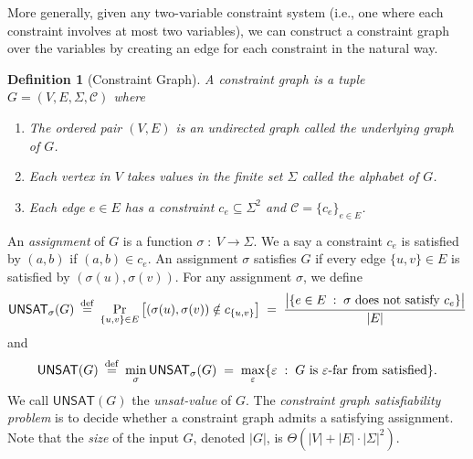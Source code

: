 \documentclass{article}
\newtheorem{definition}[theorem]{Definition}
\newcommand{\class}[1]{\mathbf{#1}}
\newcommand{\NP}{\class{NP}}
\newcommand{\UNSAT}{\mathsf{UNSAT}}
\newcommand{\eqdef}{\mathbin{\stackrel{\rm def}{=}}}
\begin{document}
More generally, given any two-variable constraint system (i.e., one where each
constraint involves at most two variables), we can construct a constraint graph
over the variables by creating an edge for each constraint in the natural way.



\begin{definition}[Constraint Graph] A constraint graph is a tuple
$G = (V, E, \Sigma, \mathcal{C})$ where
\begin{enumerate}
\item The ordered pair $(V, E)$ is an undirected graph called the underlying
  graph of $G$.
\item Each vertex in $V$ takes values in the finite set $\Sigma$
  called the alphabet of $G$.
\item Each edge $e \in E$ has a constraint $c_e \subseteq \Sigma^2$ and
  $\mathcal{C} = \{c_e\}_{e \in E}$.
\end{enumerate}
\end{definition}

An \emph{assignment} of $G$ is a function $\sigma \;:\: V \to \Sigma$.
We a say a constraint $c_e$ is satisfied by $(a, b)$ if $(a, b) \in c_e$. 
An assignment $\sigma$ satisfies $G$ if every edge $\{u, v\} \in E$
is satisfied by $(\sigma(u), \sigma(v))$.
For any assignment $\sigma$, we define
\begin{align*}
\UNSAT_\sigma(G) \;\eqdef\; \Pr_{\{u, v\} \in E} \big[(\sigma(u), \sigma(v)) \notin c_{\{u, v\}}\big] 
  \;=\; \frac{\big|\{e \in E \;:\; \sigma \text{ does not satisfy } c_e\}\big|}{|E|}
\end{align*}
and
\begin{align*}
\UNSAT(G) \;\eqdef\; \min_\sigma \UNSAT_\sigma(G)
  \;=\; \max_\varepsilon \{\varepsilon \;:\; G \text{ is } \varepsilon\text{-far from satisfied} \}.
\end{align*}
We call $\UNSAT(G)$ the \emph{unsat-value} of $G$.
The \emph{constraint graph satisfiability problem} is to decide whether
a constraint graph admits a satisfying assignment.
Note that the \emph{size} of the input $G$, denoted $|G|$, is $\Theta(|V|+|E|\cdot|\Sigma|^2)$.
\end{document}
